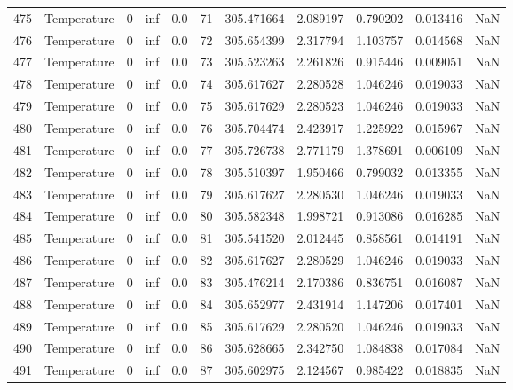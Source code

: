 \begin{tabular}{llrrrrrrrrr}
475 &  Temperature &       0 &  inf &  0.0 &   71 &  305.471664 &  2.089197 &  0.790202 &   0.013416 &      NaN \\
476 &  Temperature &       0 &  inf &  0.0 &   72 &  305.654399 &  2.317794 &  1.103757 &   0.014568 &      NaN \\
477 &  Temperature &       0 &  inf &  0.0 &   73 &  305.523263 &  2.261826 &  0.915446 &   0.009051 &      NaN \\
478 &  Temperature &       0 &  inf &  0.0 &   74 &  305.617627 &  2.280528 &  1.046246 &   0.019033 &      NaN \\
479 &  Temperature &       0 &  inf &  0.0 &   75 &  305.617629 &  2.280523 &  1.046246 &   0.019033 &      NaN \\
480 &  Temperature &       0 &  inf &  0.0 &   76 &  305.704474 &  2.423917 &  1.225922 &   0.015967 &      NaN \\
481 &  Temperature &       0 &  inf &  0.0 &   77 &  305.726738 &  2.771179 &  1.378691 &   0.006109 &      NaN \\
482 &  Temperature &       0 &  inf &  0.0 &   78 &  305.510397 &  1.950466 &  0.799032 &   0.013355 &      NaN \\
483 &  Temperature &       0 &  inf &  0.0 &   79 &  305.617627 &  2.280530 &  1.046246 &   0.019033 &      NaN \\
484 &  Temperature &       0 &  inf &  0.0 &   80 &  305.582348 &  1.998721 &  0.913086 &   0.016285 &      NaN \\
485 &  Temperature &       0 &  inf &  0.0 &   81 &  305.541520 &  2.012445 &  0.858561 &   0.014191 &      NaN \\
486 &  Temperature &       0 &  inf &  0.0 &   82 &  305.617627 &  2.280529 &  1.046246 &   0.019033 &      NaN \\
487 &  Temperature &       0 &  inf &  0.0 &   83 &  305.476214 &  2.170386 &  0.836751 &   0.016087 &      NaN \\
488 &  Temperature &       0 &  inf &  0.0 &   84 &  305.652977 &  2.431914 &  1.147206 &   0.017401 &      NaN \\
489 &  Temperature &       0 &  inf &  0.0 &   85 &  305.617629 &  2.280520 &  1.046246 &   0.019033 &      NaN \\
490 &  Temperature &       0 &  inf &  0.0 &   86 &  305.628665 &  2.342750 &  1.084838 &   0.017084 &      NaN \\
491 &  Temperature &       0 &  inf &  0.0 &   87 &  305.602975 &  2.124567 &  0.985422 &   0.018835 &      NaN \\

\end{tabular}

